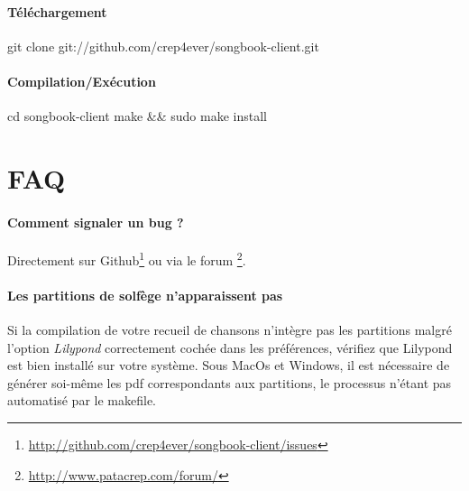 \paragraph{Téléchargement}

\begin{unix}
  git clone git://github.com/crep4ever/songbook-client.git
\end{unix}

\paragraph{Compilation/Exécution}

\begin{unix}
  cd songbook-client
  make && sudo make install
\end{unix}

\subsection{\windows}


\section{FAQ}

\paragraph{Comment signaler un bug ?}
Directement sur
Github\footnote{\url{http://github.com/crep4ever/songbook-client/issues}}
ou via le forum \footnote{\url{http://www.patacrep.com/forum/}}.

\paragraph{Les partitions de solfège n'apparaissent pas}
Si la compilation de votre recueil de chansons n'intègre pas les
partitions malgré l'option \emph{Lilypond} correctement cochée dans
les préférences, vérifiez que Lilypond est bien installé sur votre
système. Sous MacOs et Windows, il est nécessaire de générer soi-même
les pdf correspondants aux partitions, le processus n'étant pas
automatisé par le makefile.


